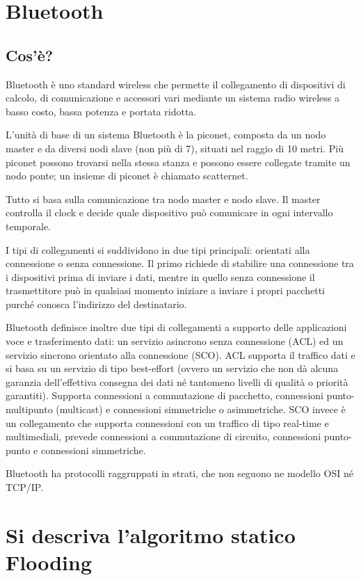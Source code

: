 \section{Bluetooth}
\subsection{Cos'è?}
Bluetooth è uno standard wireless che permette il collegamento di dispositivi di calcolo, di comunicazione e accessori vari mediante un sistema radio wireless a basso costo, bassa potenza e portata ridotta.

L’unità di base di un sistema Bluetooth è la piconet, composta da un nodo master e da diversi nodi slave (non più di 7), situati nel raggio di 10 metri. Più piconet possono trovarsi nella stessa stanza e possono essere collegate tramite un nodo ponte; un insieme di piconet è chiamato scatternet.

Tutto si basa sulla comunicazione tra nodo master e nodo slave. Il master controlla il clock e decide quale dispositivo può comunicare in ogni intervallo temporale.

I tipi di collegamenti si suddividono in due tipi principali: orientati alla connessione o senza connessione.
Il primo richiede di stabilire una connessione tra i dispositivi prima di inviare i dati, mentre in quello senza connessione il trasmettitore può in qualsiasi momento iniziare a inviare i propri pacchetti purché conosca l’indirizzo del destinatario.

Bluetooth definisce inoltre due tipi di collegamenti a supporto delle applicazioni voce e trasferimento dati: un servizio asincrono senza connessione (ACL) ed un servizio sincrono orientato alla connessione (SCO).
ACL supporta il traffico dati e si basa su un servizio di tipo best-effort (ovvero un servizio che non dà alcuna garanzia dell’effettiva consegna dei dati né tantomeno livelli di qualità o priorità garantiti).
Supporta connessioni a commutazione di pacchetto, connessioni punto-multipunto (multicast) e connessioni simmetriche o asimmetriche.
SCO invece è un collegamento che supporta connessioni con un traffico di tipo real-time e multimediali, prevede connessioni a commutazione di circuito, connessioni punto-punto e connessioni simmetriche.

Bluetooth ha protocolli raggruppati in strati, che non seguono ne modello OSI né TCP/IP.

\section{Si descriva l’algoritmo statico Flooding}

